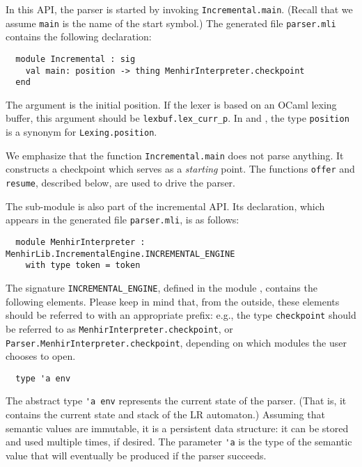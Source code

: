 \documentclass[onecolumn,11pt,nocopyrightspace,preprint]{sigplanconf}
\begin{document}


In this API, the parser is started by invoking
\verb+Incremental.main+. (Recall that we assume \verb+main+ is
the name of the start symbol.) The generated file \texttt{parser.mli} contains
the following declaration:
\begin{verbatim}
  module Incremental : sig
    val main: position -> thing MenhirInterpreter.checkpoint
  end
\end{verbatim}
The argument is the initial position. If the lexer is based on an OCaml
lexing buffer, this argument should be \verb+lexbuf.lex_curr_p+.
In  and ,
the type \verb+position+ is a synonym for \verb+Lexing.position+.

We emphasize that the function \verb+Incremental.main+ does not parse
anything. It constructs a checkpoint which serves as a \emph{starting}
point. The functions \verb+offer+ and \verb+resume+, described below, are used
to drive the parser.

The sub-module \menhirinterpreter is also part of the incremental API.
Its declaration, which appears in the generated file \texttt{parser.mli}, is as
follows:
\begin{verbatim}
  module MenhirInterpreter : MenhirLib.IncrementalEngine.INCREMENTAL_ENGINE
    with type token = token
\end{verbatim}
The signature \verb+INCREMENTAL_ENGINE+, defined in the module
\menhirlibincrementalengine, contains the following elements.
Please keep in mind that, from the outside, these elements should be referred
to with an appropriate prefix: e.g., the type \verb+checkpoint+ should be referred
to as \verb+MenhirInterpreter.checkpoint+, or
\verb+Parser.MenhirInterpreter.checkpoint+, depending on which modules the user
chooses to open.




\begin{verbatim}
  type 'a env
\end{verbatim}

The abstract type \verb+'a env+ represents the current state of the
parser. (That is, it contains the current state and stack of the LR
automaton.) Assuming that semantic values are immutable, it is a persistent
data structure: it can be stored and used multiple times, if desired.
The parameter \verb+'a+ is the type of the semantic value that will
eventually be produced if the parser succeeds.
\end{document}
